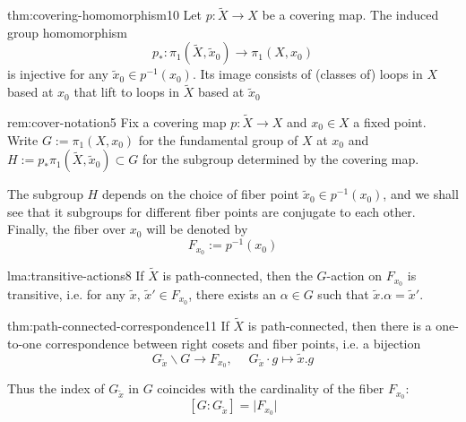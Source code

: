 \documentclass[landscape, 8pt]{extarticle}
\begin{document}
\begin{multicols*}{3}
\begin{thm}{thm:covering-homomorphism}{10}
	\vspace{-2pt}
	Let $p : \tilde{X} \to X$ be a covering map. The induced group homomorphism
	\vspace{-3pt}
	\[p_{\ast} : \pi_{1}(\tilde{X}, \tilde{x}_{0}) \to \pi_{1}(X, x_{0})\]
	is injective for any $\tilde{x}_{0}\in p^{-1}(x_{0})$. Its image consists of (classes of) loops in $X$ based at $x_{0}$ that lift to loops in $\tilde{X}$ based at $\tilde{x}_{0}$
\end{thm}

\vspace{-7pt}
\begin{rem}{rem:cover-notation}{5}
	\vspace{-2pt}
	Fix a covering map $p : \tilde{X} \to X$ and $x_{0}\in X$ a fixed point. Write $G := \pi_{1}(X, x_{0})$ for the fundamental group of $X$ at $x_{0}$ and $H := p_{\ast} \pi_{1}(\tilde{X}, \tilde{x}_{0}) \subset G$ for the subgroup determined by the covering map.

	The subgroup $H$ depends on the choice of fiber point $\tilde{x}_{0}\in p^{-1}(x_{0})$, and we shall see that it subgroups for different fiber points are conjugate to each other. Finally, the fiber over $x_{0}$ will be denoted by
	\[F_{x_{0}} := p^{-1}(x_{0})\]
\end{rem}


\vspace{-7pt}
\begin{lma}{lma:transitive-actions}{8}
	\vspace{-2pt}
	If $\tilde{X}$ is path-connected, then the $G$-action on $F_{x_{0}}$ is transitive, i.e. for any $\tilde{x},\, \tilde{x}'\in F_{x_{0}}$, there exists an $\alpha\in G$ such that $\tilde{x}.\alpha = \tilde{x}'$.
\end{lma}


\vspace{-7pt}
\begin{thm}{thm:path-connected-correspondence}{11}
	\vspace{-2pt}
	If $\tilde{X}$ is path-connected, then there is a one-to-one correspondence between right cosets and fiber points, i.e. a bijection
	\[G_{\tilde{x}} \backslash G \to F_{x_{0}},\;\quad G_{\tilde{x}} \cdot g \mapsto \tilde{x}.g\]
	\par\vspace{-5pt}
	\tcbline
	Thus the index of $G_{\tilde{x}}$ in $G$ coincides with the cardinality of the fiber $F_{x_{0}}$:
	\vspace{-6pt}
	\setcounter{equation}{19}
	\begin{equation}\label{eq:path-connected-correspondence}
		[G : G_{\tilde{x}}] = \lvert F_{x_{0}} \rvert
	\end{equation}


\end{thm}
\end{multicols*}
\end{document}
